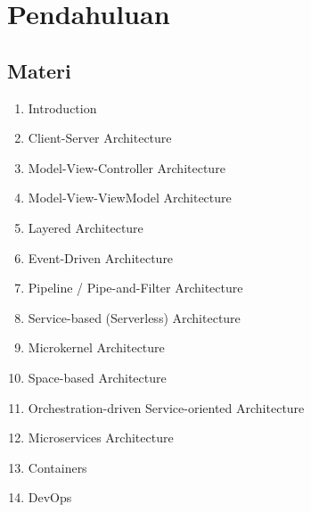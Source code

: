 \chapter{Pendahuluan}

\section{Materi}
\begin{enumerate}
\item Introduction
\item Client-Server Architecture
\item Model-View-Controller Architecture
\item Model-View-ViewModel Architecture
\item Layered Architecture
\item Event-Driven Architecture
\item Pipeline / Pipe-and-Filter Architecture
\item Service-based (Serverless) Architecture
\item Microkernel Architecture
\item Space-based Architecture
\item Orchestration-driven Service-oriented Architecture
\item Microservices Architecture
\item Containers
\item DevOps
\end{enumerate}


